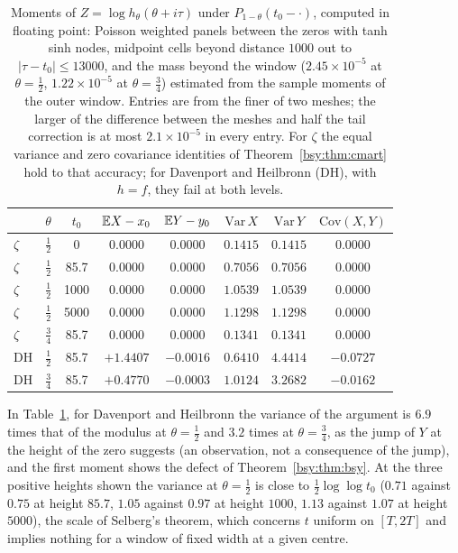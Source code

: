 \begin{table}[h]
\centering\scriptsize\setlength{\tabcolsep}{3pt}
\begin{tabular}{lccccccc}
\toprule
 & $\theta$ & $t_0$ & $\mathbb{E} X-x_0$ & $\mathbb{E} Y-y_0$ & $\mathrm{Var}\,X$ & $\mathrm{Var}\,Y$ & $\mathrm{Cov}(X,Y)$\\
\midrule
$\zeta$ & $\tfrac12$ & 0 & $0.0000$ & $0.0000$ & $0.1415$ & $0.1415$ & $0.0000$\\
$\zeta$ & $\tfrac12$ & 85.7 & $0.0000$ & $0.0000$ & $0.7056$ & $0.7056$ & $0.0000$\\
$\zeta$ & $\tfrac12$ & 1000 & $0.0000$ & $0.0000$ & $1.0539$ & $1.0539$ & $0.0000$\\
$\zeta$ & $\tfrac12$ & 5000 & $0.0000$ & $0.0000$ & $1.1298$ & $1.1298$ & $0.0000$\\
$\zeta$ & $\tfrac34$ & 85.7 & $0.0000$ & $0.0000$ & $0.1341$ & $0.1341$ & $0.0000$\\
DH & $\tfrac12$ & 85.7 & $+1.4407$ & $-0.0016$ & $0.6410$ & $4.4414$ & $-0.0727$\\
DH & $\tfrac34$ & 85.7 & $+0.4770$ & $-0.0003$ & $1.0124$ & $3.2682$ & $-0.0162$\\
\bottomrule
\end{tabular}
\caption{Moments of $Z=\log h_\theta(\theta+i\tau)$ under $P_{1-\theta}(t_0-\cdot)$, computed in floating point: Poisson weighted panels between the zeros with tanh sinh nodes, midpoint cells beyond distance $1000$ out to $|\tau-t_0|\le13000$, and the mass beyond the window ($2.45\times10^{-5}$ at $\theta=\frac12$, $1.22\times10^{-5}$ at $\theta=\frac34$) estimated from the sample moments of the outer window. Entries are from the finer of two meshes; the larger of the difference between the meshes and half the tail correction is at most $2.1\times10^{-5}$ in every entry. For $\zeta$ the equal variance and zero covariance identities of Theorem~\ref{bsy:thm:cmart} hold to that accuracy; for Davenport and Heilbronn (DH), with $h=f$, they fail at both levels.}\label{bsy:tab:cm}
\end{table}

In Table~\ref{bsy:tab:cm}, for Davenport and Heilbronn the variance of the argument is $6.9$ times that of the modulus at $\theta=\frac12$ and $3.2$ times at $\theta=\frac34$, as the jump of $Y$ at the height of the zero suggests (an observation, not a consequence of the jump), and the first moment shows the defect of Theorem~\ref{bsy:thm:bsy}. At the three positive heights shown the variance at $\theta=\frac12$ is close to $\frac12\log\log t_0$ ($0.71$ against $0.75$ at height $85.7$, $1.05$ against $0.97$ at height $1000$, $1.13$ against $1.07$ at height $5000$), the scale of Selberg's theorem, which concerns $t$ uniform on $[T,2T]$ and implies nothing for a window of fixed width at a given centre.

